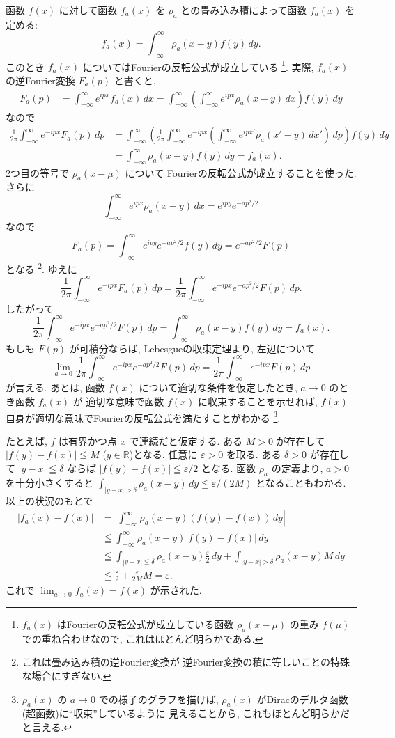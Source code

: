 \documentclass[12pt,twoside]{jarticle}
\newcommand\R{{\mathbb R}} %
\newcommand\eps{\varepsilon}
\theoremstyle{jplain}
\theoremstyle{jplain}
\theoremstyle{jplain}
\numberwithin{theorem}{section}
\numberwithin{equation}{section}
\numberwithin{figure}{section}
\numberwithin{table}{section}
\begin{document}
函数 $f(x)$ に対して函数 $f_a(x)$ を 
$\rho_a$ との畳み込み積によって函数 $f_a(x)$ を定める:
\[
f_a(x) = \int_{-\infty}^\infty \rho_a(x-y) f(y)\,dy.
\]
このとき $f_a(x)$ についてはFourierの反転公式が成立している%
\footnote{$f_a(x)$ はFourierの反転公式が成立している函数 
$\rho_a(x-\mu)$ の重み $f(\mu)$ での重ね合わせなので, 
これはほとんど明らかである.}.
実際, $f_a(x)$ の逆Fourier変換 $F_a(p)$ と書くと, 
\begin{align*}
F_a(p) 
&= \int_{-\infty}^\infty e^{ipx} f_a(x)\,dx
= \int_{-\infty}^\infty
  \left( \int_{-\infty}^\infty e^{ipx} \rho_a(x-y)\,dx \right)
  f(y)\,dy
\end{align*}
なので
\begin{align*}
\frac{1}{2\pi}\int_{-\infty}^\infty e^{-ipx}F_a(p)\,dp
&=
\int_{-\infty}^\infty
\left(
\frac{1}{2\pi}
\int_{-\infty}^\infty
e^{-ipx}
\left(
\int_{-\infty}^\infty
e^{ipx'}\rho_a(x'-y)\,dx'
\right)
\,dp
\right)
f(y)\,dy
\\ &
=
\int_{-\infty}^\infty \rho_a(x-y) f(y) \,dy
=
f_a(x).
\end{align*}
2つ目の等号で $\rho_a(x-\mu)$ について
Fourierの反転公式が成立することを使った.
さらに
\[
\int_{-\infty}^\infty e^{ipx} \rho_a(x-y)\,dx
=e^{ipy}e^{-ap^2/2}
\]
なので
\[
F_a(p)=\int_{-\infty}^\infty e^{ipy}e^{-ap^2/2}f(y)\,dy=e^{-ap^2/2}F(p)
\]
となる%
\footnote{これは畳み込み積の逆Fourier変換が
逆Fourier変換の積に等しいことの特殊な場合にすぎない.}. 
ゆえに
\[
\frac{1}{2\pi}\int_{-\infty}^\infty e^{-ipx}F_a(p)\,dp
=\frac{1}{2\pi}\int_{-\infty}^\infty e^{-ipx}e^{-ap^2/2}F(p)\,dp.
\]
したがって
\[
\frac{1}{2\pi}\int_{-\infty}^\infty e^{-ipx}e^{-ap^2/2}F(p)\,dp 
= \int_{-\infty}^\infty \rho_a(x-y)f(y)\,dy
= f_a(x).
\]
もしも $F(p)$ が可積分ならば, Lebesgueの収束定理より, 左辺について
\[
\lim_{a\to 0}\frac{1}{2\pi}\int_{-\infty}^\infty e^{-ipx}e^{-ap^2/2}F(p)\,dp
=\frac{1}{2\pi}\int_{-\infty}^\infty e^{-ipx}F(p)\,dp
\]
が言える.
あとは, 函数 $f(x)$ について適切な条件を仮定したとき, 
$a\to 0$ のとき函数 $f_a(x)$ が
適切な意味で函数 $f(x)$ に収束することを示せれば,  
$f(x)$ 自身が適切な意味でFourierの反転公式を満たすことがわかる%
\footnote{$\rho_a(x)$ の $a\to 0$ での様子のグラフを描けば, 
$\rho_a(x)$ がDiracのデルタ函数(超函数)に``収束''しているように
見えることから, これもほとんど明らかだと言える.}.

たとえば, $f$ は有界かつ点 $x$ で連続だと仮定する.
ある $M>0$ が存在して $|f(y)-f(x)|\leqq M$ ($y\in\R$)となる.
任意に $\eps>0$ を取る.
ある $\delta >0$ が存在して 
$|y-x|\leqq\delta$ ならば $|f(y)-f(x)|\leqq\eps/2$ となる.
函数 $\rho_a$ の定義より, 
$a>0$ を十分小さくすると $\int_{|y-x|>\delta}\rho_a(x-y)\,dy\leqq\eps/(2M)$ 
となることもわかる. 以上の状況のもとで
\begin{align*}
|f_a(x)-f(x)|
&=
\left|
\int_{-\infty}^\infty \rho_a(x-y)(f(y)-f(x))\,dy
\right|
\\ &
\leqq
\int_{-\infty}^\infty \rho_a(x-y)|f(y)-f(x)|\,dy
\\ &
\leqq
\int_{|y-x|\leqq\delta} \rho_a(x-y)\frac{\eps}{2}\,dy
+
\int_{|y-x|>\delta} \rho_a(x-y)M\,dy
\\ &
\leqq \frac{\eps}{2}+\frac{\eps}{2M}M
=\eps.
\end{align*}
これで $\lim_{a\to 0}f_a(x)=f(x)$ が示された.
\end{document}
